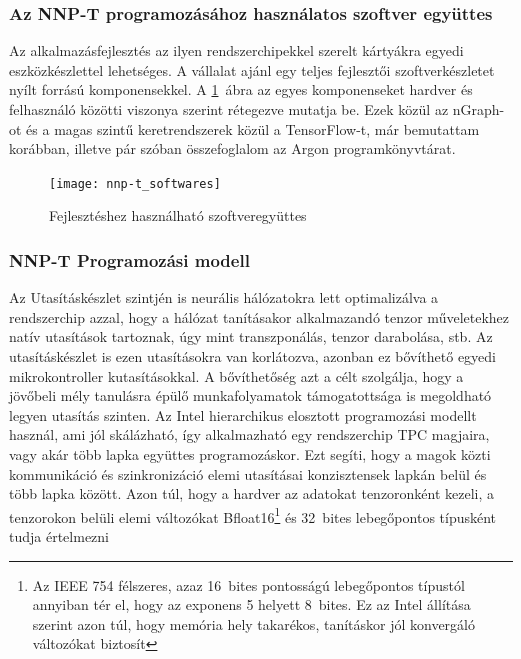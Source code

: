 \subsubsection{Az NNP-T programozásához használatos szoftver együttes}
Az alkalmazásfejlesztés az ilyen rendszerchipekkel szerelt kártyákra egyedi eszközkészlettel lehetséges. A vállalat ajánl egy teljes fejlesztői szoftverkészletet nyílt forrású komponensekkel. A \ref{fig:nnp-tSwStack}~ábra az egyes komponenseket hardver és felhasználó közötti viszonya szerint rétegezve mutatja be. Ezek közül az nGraph-ot és a magas szintű keretrendszerek közül a TensorFlow-t, már bemutattam korábban, illetve pár szóban összefoglalom az Argon programkönyvtárat.
\begin{figure}[H]
	\centering
	\texttt{[image: nnp-t\_softwares]}
	\caption[Szoftverek]{Fejlesztéshez használható szoftveregyüttes}
	\label{fig:nnp-tSwStack}
\end{figure}

\subsubsection{NNP-T Programozási modell}
Az Utasításkészlet szintjén is neurális hálózatokra lett optimalizálva a rendszerchip azzal, hogy a hálózat tanításakor alkalmazandó tenzor műveletekhez natív utasítások tartoznak, úgy mint transzponálás, tenzor darabolása, stb. Az utasításkészlet is ezen utasításokra van korlátozva, azonban ez bővíthető egyedi mikrokontroller kutasításokkal. A bővíthetőség azt a célt szolgálja, hogy a jövőbeli mély tanulásra épülő munkafolyamatok támogatottsága is megoldható legyen utasítás szinten. 
Az Intel hierarchikus elosztott programozási modellt használ, ami jól skálázható, így alkalmazható egy rendszerchip TPC magjaira, vagy akár több lapka együttes programozáskor. Ezt segíti, hogy a magok közti kommunikáció és szinkronizáció elemi utasításai konzisztensek lapkán belül és több lapka között.
Azon túl, hogy a hardver az adatokat tenzoronként kezeli, a tenzorokon belüli elemi változókat Bfloat16\footnote{Az IEEE 754 félszeres, azaz 16~bites pontosságú lebegőpontos típustól annyiban tér el, hogy az exponens 5 helyett 8~bites. Ez az Intel állítása szerint azon túl, hogy memória hely takarékos, tanításkor jól konvergáló változókat biztosít} és 32~bites lebegőpontos típusként tudja értelmezni

